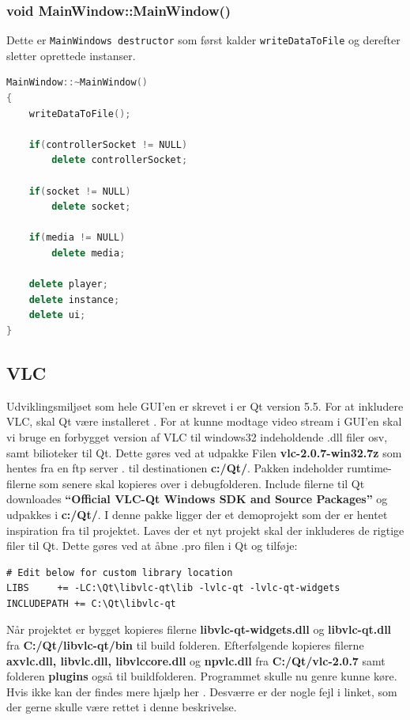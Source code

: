 \subsubsection{void MainWindow::MainWindow()}
Dette er \texttt{MainWindows destructor} som først kalder \texttt{writeDataToFile} og derefter sletter oprettede instanser.
\begin{lstlisting}[caption={MainWindow},label=lst:MainWindow, language=c++]
MainWindow::~MainWindow()
{
    writeDataToFile();

    if(controllerSocket != NULL)
        delete controllerSocket;

    if(socket != NULL)
        delete socket;

    if(media != NULL)
        delete media;

    delete player;
    delete instance;
    delete ui;
}
\end{lstlisting}

\subsection{VLC}
Udviklingsmiljøet som hele GUI'en er skrevet i er Qt version 5.5. For at inkludere VLC, skal Qt være installeret \cite{lib:qt}. For at kunne modtage video stream i GUI'en skal vi bruge en forbygget version af VLC til windows32 indeholdende .dll filer osv, samt bilioteker til Qt. Dette gøres ved at udpakke Filen \textbf{vlc-2.0.7-win32.7z} som hentes fra en ftp server \cite{lib:vlc-ftp}. til destinationen \textbf{c:/Qt/}. Pakken indeholder rumtime-filerne som senere skal kopieres over i debugfolderen. Include filerne til Qt downloades \textbf{“Official VLC-Qt Windows SDK and Source Packages”} \cite{lib:vlc-qt} og udpakkes i \textbf{c:/Qt/}. I denne pakke ligger der et demoprojekt som der er hentet inspiration fra til projektet. Laves der et nyt projekt skal der inkluderes de rigtige filer til Qt. Dette gøres ved at åbne .pro filen i Qt og tilføje:

\begin{lstlisting}
# Edit below for custom library location
LIBS     += -LC:\Qt\libvlc-qt\lib -lvlc-qt -lvlc-qt-widgets
INCLUDEPATH += C:\Qt\libvlc-qt
\end{lstlisting}
Når projektet er bygget kopieres filerne \textbf{libvlc-qt-widgets.dll} og \textbf{libvlc-qt.dll} fra \textbf{C:/Qt/libvlc-qt/bin} til build folderen. Efterfølgende kopieres filerne \textbf{axvlc.dll, libvlc.dll, libvlccore.dll} og \textbf{npvlc.dll} fra \textbf{C:/Qt/vlc-2.0.7} samt folderen \textbf{plugins} også til buildfolderen. Programmet skulle nu genre kunne køre. Hvis ikke kan der findes mere hjælp her \cite{lib:vlc-using-qt}. Desværre er der nogle fejl i linket, som der gerne skulle være rettet i denne beskrivelse. 

